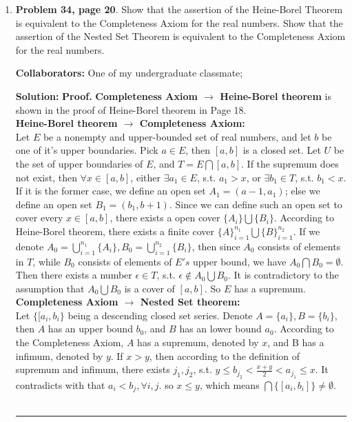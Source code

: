 \documentclass{article}%
\newenvironment{proof}[1][Proof]{\textbf{#1.} }{\ \rule{0.5em}{0.5em}}
\begin{document}
\begin{enumerate}
\item \textbf{Problem 34, page 20}.  Show that the assertion of the Heine-Borel Theorem is equivalent to the Completeness Axiom for the real numbers.  Show that the assertion of the Nested Set Theorem is equivalent to the Completeness Axiom for the real numbers.

\bigskip
\textbf{Collaborators:} One of my undergraduate classmate;
\smallskip
 
\textbf{Solution:}
\begin{proof}
\textbf{Completeness Axiom $\to$ Heine-Borel theorem} is shown in the proof of Heine-Borel theorem in Page 18.
\\[5pt]
\textbf{Heine-Borel theorem $\to$ Completeness Axiom:} \\
Let $E$ be a nonempty and upper-bounded set of real numbers, and let $b$ be one of it's upper boundaries. Pick $a\in E$, then $[a, b]$ is a closed set. Let $U$ be the set of upper boundaries of $E$, and $T = E\bigcap [a, b]$. If the supremum does not exist, then $\forall x\in[a, b]$, either $\exists a_1\in E$, s.t. $a_1 > x$, or $\exists b_1\in T$, s.t. $b_1 < x$. If it is the former case, we define an open set $A_1 = (a-1, a_1)$; else we define an open set $B_1 = (b_1, b+1)$. Since we can define such an open set to cover every $x\in [a, b]$, there exists a open cover $\{A_i\}\bigcup\{B_i\}$. According to Heine-Borel theorem, there exists a finite cover $\{A\}_{i = 1}^{n_1}\bigcup\{B\}_{i = 1}^{n_2}$. If we denote $A_0 = \bigcup_{i=1}^{n_1}\{A_i\}, B_0 = \bigcup_{i=1}^{n_2}\{B_i\}$, then since $A_0$ consists of elements in $T$, while $B_0$ consists of elements of $E's$ upper bound, we have $A_0\bigcap B_0 = \emptyset$. Then there exists a number $\epsilon\in T$, s.t. $\epsilon\notin A_0\bigcup B_0$. It is contradictory to the assumption that $A_0\bigcup B_0$ is a cover of $[a, b]$. So $E$ has a supremum. \\[5pt]
\textbf{Completeness Axiom $\to$ Nested Set theorem:} \\
Let $\{[a_i, b_i\}$ being a descending closed set series. Denote $A = \{a_i\}, B = \{b_i\}$, then $A$ has an upper bound $b_0$, and $B$ has an lower bound $a_0$. According to the Completeness Axiom, $A$ has a supremum, denoted by $x$, and B has a infimum, denoted by $y$. If $x > y$, then according to the definition of supremum and infimum, there exists $j_1, j_2$, s.t. $y \le b_{j_2} < \frac{x+y}{2} < a_{j_1} \le x$. It contradicts with that $a_i < b_j, \forall i, j$. so $x \le y$, which means $\bigcap \{[a_i, b_i]\} \ne \emptyset$. \\

\end{proof}
\end{enumerate}
\end{document}

